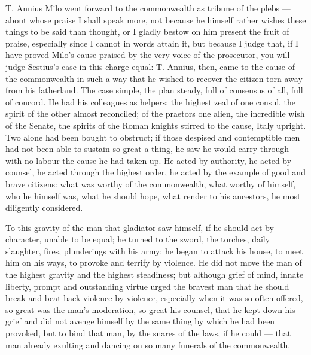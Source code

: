  T. Annius Milo went forward to the commonwealth as tribune of the plebs --- about whose praise I shall speak more, not because he himself rather wishes these things to be said than thought, or I gladly bestow on him present the fruit of praise, especially since I cannot in words attain it, but because I judge that, if I have proved Milo's cause praised by the very voice of the prosecutor, you will judge Sestius's case in this charge equal: T. Annius, then, came to the cause of the commonwealth in such a way that he wished to recover the citizen torn away from his fatherland. The case simple, the plan steady, full of consensus of all, full of concord. He had his colleagues as helpers; the highest zeal of one consul, the spirit of the other almost reconciled; of the praetors one alien, the incredible wish of the Senate, the spirits of the Roman knights stirred to the cause, Italy upright. Two alone had been bought to obstruct; if those despised and contemptible men had not been able to sustain so great a thing, he saw he would carry through with no labour the cause he had taken up. He acted by authority, he acted by counsel, he acted through the highest order, he acted by the example of good and brave citizens: what was worthy of the commonwealth, what worthy of himself, who he himself was, what he should hope, what render to his ancestors, he most diligently considered.

 To this gravity of the man that gladiator saw himself, if he should act by character, unable to be equal; he turned to the sword, the torches, daily slaughter, fires, plunderings with his army; he began to attack his house, to meet him on his ways, to provoke and terrify by violence. He did not move the man of the highest gravity and the highest steadiness; but although grief of mind, innate liberty, prompt and outstanding virtue urged the bravest man that he should break and beat back violence by violence, especially when it was so often offered, so great was the man's moderation, so great his counsel, that he kept down his grief and did not avenge himself by the same thing by which he had been provoked, but to bind that man, by the snares of the laws, if he could --- that man already exulting and dancing on so many funerals of the commonwealth.

